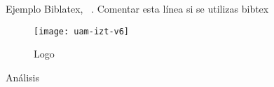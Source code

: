 Ejemplo Biblatex, \textcite{Akram2014}~\citeyear{Akram2014}. Comentar esta línea si se utilizas bibtex

\begin{figure}[ht]
  \centering
  \texttt{[image: uam-izt-v6]}
  \caption{Logo}
  \label{fig:logo_uam}
\end{figure}

\begin{table}
  \centering
  \caption{Análisis}\label{cdr:example}
    
\end{table}

